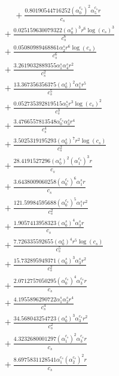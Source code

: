 \documentclass[10pt]{article}
\begin{document}
\begin{align*}
\phantom{R_{3,9}} &\phantom{={}}{}  + \frac{0.80190544716252 \left(\alpha_{0}^{c_s}\right)^{2} \alpha_{5}^{c_s} r}{c_{s}} \\
&{}  + \frac{0.025159630079322 \left(\alpha_{0}^s\right)^{3} r^{6} \log{\left(c_{s} \right)}^{3}}{c_{s}^{6}} \\
&{}  + \frac{0.05080989468861 \alpha_{2}^s r^{6} \log{\left(c_{s} \right)}}{c_{s}^{6}} \\
&{}  + \frac{3.2619032889355 \alpha_{1}^s \alpha_{4}^s r^{2}}{c_{s}^{2}} \\
&{}  + \frac{13.367356356375 \left(\alpha_{0}^s\right)^{2} \alpha_{1}^s r^{5}}{c_{s}^{5}} \\
&{}  + \frac{0.052735392819515 \alpha_{5}^s r^{3} \log{\left(c_{s} \right)}^{2}}{c_{s}^{3}} \\
&{}  + \frac{3.4766557813548 \alpha_{0}^{c_s} \alpha_{3}^s r^{4}}{c_{s}^{4}} \\
&{}  + \frac{3.5025319195293 \left(\alpha_{0}^s\right)^{7} r^{2} \log{\left(c_{s} \right)}}{c_{s}^{2}} \\
&{}  + \frac{28.4191527296 \left(\alpha_{0}^s\right)^{2} \left(\alpha_{1}^{c_s}\right)^{3} r}{c_{s}} \\
&{}  + \frac{3.6438009060258 \left(\alpha_{0}^{c_s}\right)^{6} \alpha_{1}^s r}{c_{s}} \\
&{}  + \frac{121.59984595688 \left(\alpha_{0}^{c_s}\right)^{5} \alpha_{1}^s r^{2}}{c_{s}^{2}} \\
&{}  + \frac{1.9057413958323 \left(\alpha_{0}^s\right)^{4} \alpha_{3}^s r}{c_{s}} \\
&{}  + \frac{7.726335592655 \left(\alpha_{0}^s\right)^{4} r^{5} \log{\left(c_{s} \right)}}{c_{s}^{5}} \\
&{}  + \frac{15.732895949371 \left(\alpha_{0}^s\right)^{3} \alpha_{3}^s r^{2}}{c_{s}^{2}} \\
&{}  + \frac{2.0712757050295 \left(\alpha_{0}^{c_s}\right)^{4} \alpha_{3}^{c_s} r}{c_{s}} \\
&{}  + \frac{4.1955896290722 \alpha_{1}^s \alpha_{2}^s r^{4}}{c_{s}^{4}} \\
&{}  + \frac{34.568043254723 \left(\alpha_{0}^s\right)^{3} \alpha_{3}^{c_s} r^{2}}{c_{s}^{2}} \\
&{}  + \frac{4.3232680001297 \left(\alpha_{1}^{c_s}\right)^{2} \alpha_{3}^{c_s} r}{c_{s}} \\
&{}  + \frac{8.6975831128541 \alpha_{1}^{c_s} \left(\alpha_{2}^{c_s}\right)^{2} r}{c_{s}} \\

\end{align*}
\end{document}
